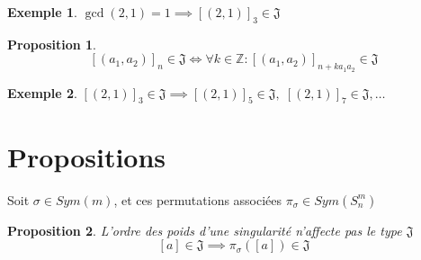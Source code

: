 \documentclass{article}
\newtheorem{proposition}{Proposition}
\newtheorem{exemple}{Exemple}
\begin{document}
\begin{exemple}
    $\gcd(2, 1) = 1 \implies {[(2, 1)]}_3 \in \mathfrak{J}$
\end{exemple}

\begin{proposition}
    \[ 
    [(a_1, a_2)]_n \in \mathfrak{J} \iff 
    \forall k \in \mathbb{Z}: {[(a_1, a_2)]}_{n+ka_1a_2} \in \mathfrak{J} 
    \]
\end{proposition}

\begin{exemple}
    $[(2, 1)]_3 \in \mathfrak{J} \implies {[(2, 1)]}_5 \in \mathfrak{J},\; {[(2, 1)]}_7 \in \mathfrak{J}, \dots$
\end{exemple}

\newpage

\section{Propositions}

Soit $\sigma \in Sym(m)$, et ces permutations associées $\pi_{\sigma} \in Sym(S_n^m)$

\begin{proposition}
    L'ordre des poids d'une singularité n'affecte pas le type $\mathfrak{J}$
    \[ [a] \in \mathfrak{J} \implies \pi_{\sigma}([a]) \in \mathfrak{J} \]
\end{proposition}
\end{document}

